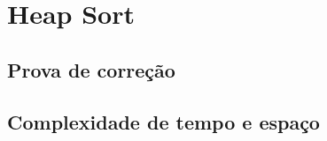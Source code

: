 \section{Heap Sort}
\lipsum[21]




\subsection{Prova de correção}
\lipsum[19]

\subsection{Complexidade de tempo e espaço}
\lipsum[19]
